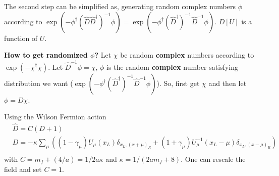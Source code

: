The second step can be simplified as, generating random complex numbers $\phi$ according to $\exp (-\phi^{\dagger} \left(\hat{D}\hat{D}^{\dagger}\right)^{-1}\phi)=\exp (-\phi^{\dagger}(\hat{D}^{\dagger})^{-1} \hat{D}^{-1}\phi)$. $D[U]$ is a function of $U$.

\textbf{How to get randomized $\phi$?} Let $\chi$ be random \textbf{complex} numbers according to $\exp (-\chi ^{\dagger}\chi)$. Let $\hat{D}^{-1}\phi=\chi$, $\phi$ is the random \textbf{complex} number satisfying distribution we want ($\exp (-\phi^{\dagger}(\hat{D}^{\dagger})^{-1} \hat{D}^{-1}\phi)$). So, first get $\chi$ and then let $\phi = D\chi$.

Using the Wilson Fermion action
\begin{equation}
\begin{split}
&\hat{D}=C(D+1)\\
&D=-\kappa\sum _{\mu}\left((1-\gamma _{\mu})U_{\mu}(x _L)\delta _{x _L,(x+\mu)_R}+(1+\gamma _{\mu})U_{\mu}^{-1}(x _L-\mu)\delta _{x_L,(x-\mu)_R}\right)\\
\end{split}
\end{equation}
with $C=m_f+\left(4/a\right)=1/2a\kappa$ and $\kappa=1/(2am_f+8)$. One can rescale the field and set $C=1$.


